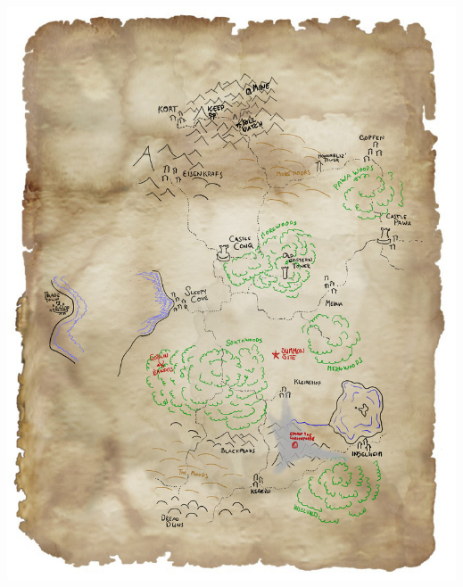 \clearpage                  %
\begin{samepage}
\null
\thispagestyle{empty}
\vfill
\noindent
\includegraphics[width=0.999\textwidth]{./map/region-eviction-gm.jpg}
\vfill
\end{samepage}

















